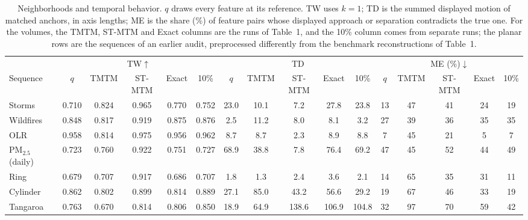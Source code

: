 \begin{table}[!htb]
\centering
\caption{Neighborhoods and temporal behavior. $q$ draws every feature at its reference. TW uses $k=1$; TD is the summed displayed motion of matched anchors, in axis lengths; ME is the share (\%) of feature pairs whose displayed approach or separation contradicts the true one. For the volumes, the TMTM, ST-MTM and Exact columns are the runs of Table~1, and the 10\% column comes from separate runs; the planar rows are the sequences of an earlier audit, preprocessed differently from the benchmark reconstructions of Table~1.}
\label{tab:temporal}
\footnotesize
\setlength{\tabcolsep}{2.5pt}
\begin{tabular}{@{}l ccccc ccccc ccccc@{}}
\toprule
 & \multicolumn{5}{c}{TW$\uparrow$} & \multicolumn{5}{c}{TD} & \multicolumn{5}{c}{ME (\%)$\downarrow$} \\
\cmidrule(lr){2-6}\cmidrule(lr){7-11}\cmidrule(l){12-16}
Sequence & $q$ & TMTM & ST-MTM & Exact & 10\% & $q$ & TMTM & ST-MTM & Exact & 10\% & $q$ & TMTM & ST-MTM & Exact & 10\% \\
\midrule
Storms & 0.710 & 0.824 & 0.965 & 0.770 & 0.752 & 23.0 & 10.1 & 7.2 & 27.8 & 23.8 & 13 & 47 & 41 & 24 & 19 \\
Wildfires & 0.848 & 0.817 & 0.919 & 0.875 & 0.876 & 2.5 & 11.2 & 8.0 & 8.1 & 3.2 & 27 & 39 & 36 & 35 & 35 \\
OLR & 0.958 & 0.814 & 0.975 & 0.956 & 0.962 & 8.7 & 8.7 & 2.3 & 8.9 & 8.8 & 7 & 45 & 21 & 5 & 7 \\
PM$_{2.5}$ (daily) & 0.723 & 0.760 & 0.922 & 0.751 & 0.727 & 68.9 & 38.8 & 7.8 & 76.4 & 69.2 & 47 & 45 & 52 & 44 & 49 \\
Ring & 0.679 & 0.707 & 0.917 & 0.686 & 0.707 & 1.8 & 1.3 & 2.4 & 3.6 & 2.1 & 14 & 65 & 35 & 31 & 11 \\
Cylinder & 0.862 & 0.802 & 0.899 & 0.814 & 0.889 & 27.1 & 85.0 & 43.2 & 56.6 & 29.2 & 19 & 67 & 46 & 33 & 19 \\
Tangaroa & 0.763 & 0.670 & 0.814 & 0.806 & 0.850 & 18.9 & 64.9 & 138.6 & 106.9 & 104.8 & 32 & 97 & 70 & 59 & 42 \\
\bottomrule
\end{tabular}
\end{table}
